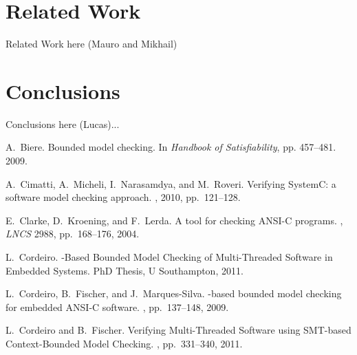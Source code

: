 \documentclass[a4paper]{llncs}
\begin{document}
\section{Related Work}
%
Related Work here (Mauro and Mikhail)

\section{Conclusions}
%
Conclusions here (Lucas)...



\vspace{-2.5ex}
\renewcommand\refname{{\normalsize References}}
{\begin{thebibliography}{10}
\vspace{-0.5ex}


A.~Biere.
\newblock Bounded model checking.
\newblock In {\em Handbook of Satisfiability}, pp. 457--481. 2009.

A.~Cimatti, A.~Micheli, I.~Narasamdya, and M.~Roveri.
\newblock Verifying {SystemC}: a software model checking approach.
, 2010, pp.\ 121--128.

E.~Clarke, D.~Kroening, and F.~Lerda.
\newblock A tool for checking {ANSI-C} programs.
, {\em LNCS} 2988, pp.\ 168--176, 2004.

L.~Cordeiro.
-Based Bounded Model Checking of Multi-Threaded Software in 
Embedded Systems.
\newblock PhD Thesis, U Southampton, 2011.

L.~Cordeiro, B.~Fischer, and J.~Marques-Silva.
-based bounded model checking for embedded {ANSI-C} software.
, pp.\ 137--148, 2009. 

L.~Cordeiro and B.~Fischer.
\newblock Verifying Multi-Threaded Software using {SMT}-based Context-Bounded 
Model Checking.
, pp.\ 331--340, 2011. 



\end{thebibliography}}
\end{document}
